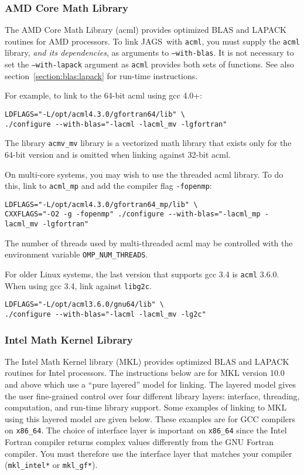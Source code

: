 \documentclass[11pt, a4paper, titlepage]{report}
\newcommand{\JAGS}{\textsf{JAGS}}
\begin{document}
\subsubsection{AMD Core Math Library}
\label{section:acml:linux}

The AMD Core Math Library (acml) provides optimized BLAS and LAPACK
routines for AMD processors. To link \JAGS\ with \texttt{acml}, you
must supply the \texttt{acml} library, {\em and its dependencies}, as
arguments to \texttt{--with-blas}.  It is not necessary to set the
\texttt{--with-lapack} argument as \texttt{acml} provides both sets of
functions. See also section~\ref{section:blas:lapack} for run-time
instructions.

For example, to link to the 64-bit acml using gcc 4.0+:
\begin{verbatim}
LDFLAGS="-L/opt/acml4.3.0/gfortran64/lib" \
./configure --with-blas="-lacml -lacml_mv -lgfortran" 
\end{verbatim}
The library \verb+acmv_mv+ library is a vectorized math library that
exists only for the 64-bit version and is omitted when linking against
32-bit acml.

On multi-core systems, you may wish to use the threaded acml library.
To do this, link to \verb+acml_mp+ and add the compiler flag
\verb+-fopenmp+:
\begin{verbatim}
LDFLAGS="-L/opt/acml4.3.0/gfortran64_mp/lib" \
CXXFLAGS="-O2 -g -fopenmp" ./configure --with-blas="-lacml_mp -lacml_mv -lgfortran" 
\end{verbatim}
The number of threads used by multi-threaded acml may be controlled
with the environment variable \verb+OMP_NUM_THREADS+.

For older Linux systems, the last version that supports gcc 3.4 is
\texttt{acml} 3.6.0. When using gcc 3.4, link against \texttt{libg2c}.
\begin{verbatim}
LDFLAGS="-L/opt/acml3.6.0/gnu64/lib" \
./configure --with-blas="-lacml -lacml_mv -lg2c"
\end{verbatim}

\subsubsection{Intel Math Kernel Library}

The Intel Math Kernel library (MKL) provides optimized BLAS and LAPACK
routines for Intel processors. The instructions below are for MKL
version 10.0 and above which use a ``pure layered'' model for linking.
The layered model gives the user fine-grained control over four
different library layers: interface, threading, computation, and
run-time library support. Some examples of linking to MKL using this
layered model are given below. These examples are for GCC compilers on
\verb+x86_64+. The choice of interface layer is important on
\verb+x86_64+ since the Intel Fortran compiler returns complex values
differently from the GNU Fortran compiler. You must therefore use the
interface layer that matches your compiler (\verb+mkl_intel*+ or \verb+mkl_gf*+).  
\end{document}
